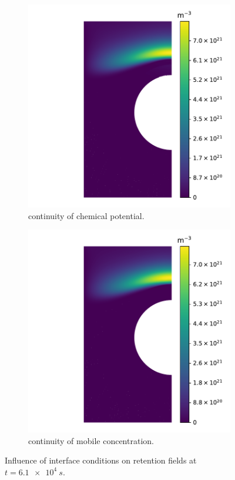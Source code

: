\begin{figure}
    \centering
    \begin{subfigure}{0.5\linewidth}
        \includegraphics[width=\linewidth]{Figures/Chapter3/monoblocks/interface_condition/retention_chemical_pot_short_exposure.pdf}
        \caption{continuity of chemical potential.}
    \end{subfigure}%
    \begin{subfigure}{0.5\linewidth}
        \includegraphics[width=\linewidth]{Figures/Chapter3/monoblocks/interface_condition/retention_concentration_short_exposure.pdf}
        \caption{continuity of mobile concentration.}
    \end{subfigure}
    \caption{Influence of interface conditions on retention fields at $t=\SI{6.1e4}{s}$.}
\end{figure}

